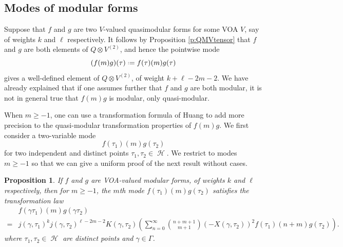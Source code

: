 \documentclass[12pt]{amsart}
\theoremstyle{plain}
\newtheorem{prop}[thm]{Proposition}
\theoremstyle{definition}
\theoremstyle{remark}
\DeclareMathOperator{\uhp}{\mathcal{H}}
\newcommand*{\df}{\mathrel{\vcenter{\baselineskip0.5ex \lineskiplimit0pt
                     \hbox{\scriptsize.}\hbox{\scriptsize.}}} =}
\begin{document}
\subsection{Modes of modular forms}
\label{ss:modes}
Suppose that $f$ and $g$ are two $V$-valued quasimodular forms for some VOA $V$, say of weights $k$ and $\ell$ respectively. It follows by Proposition \ref{p:QMVtensor} that $f$ and $g$ are both elements of $Q\otimes V^{(2)}$, and hence the pointwise mode
\[
(f(m)g)(\tau) \df f(\tau)(m)g(\tau)
\]
gives a well-defined element of $Q\otimes V^{(2)}$, of weight $k+\ell-2m-2$. We have already explained that if one assumes further that $f$ and $g$ are both modular, it is not in general true that $f(m)g$ is modular, only quasi-modular.

When $m\geq -1$, one can use a transformation formula of Huang \cite{Huang, FBZ} to add more precision to the quasi-modular transformation properties of $f(m)g$. We first consider a two-variable mode
\[
f(\tau_1)(m)g(\tau_2)
\]
for two independent and distinct points $\tau_1,\tau_2 \in \uhp$. We restrict to modes $m\geq -1$ so that we can give a uniform proof of the next result without cases.
\begin{prop}
\label{p:positivemodes}
    If $f$ and $g$ are VOA-valued modular forms, of weights $k$ and $\ell$ respectively, then for $m\geq -1$, the $m$th mode $f(\tau_1)(m)g(\tau_2)$ satisfies the transformation law
 \begin{align}
        \label{eq:prodtran}
        &f(\gamma\tau_1)(m)g(\gamma\tau_2)\\
        \nonumber =&j(\gamma,\tau_1)^kj(\gamma,\tau_2)^{\ell-2m-2}K(\gamma,\tau_2)\left(\sum_{n=0}^{\infty}\binom{n+m+1}{m+1}(-X(\gamma, \tau_2))^2f(\tau_1)(n+m)g(\tau_2)\right).
    \end{align}
    where $\tau_1,\tau_2 \in \uhp$ are distinct points and $\gamma \in \Gamma$.
\end{prop}
\end{document}
